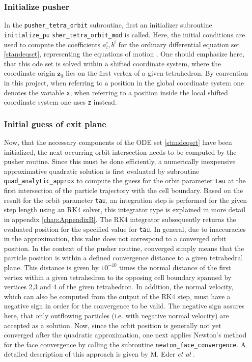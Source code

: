 \documentclass[./main.tex]{subfiles}
\begin{document}
\subsubsection{Initialize pusher} 
In the \texttt{pusher\_tetra\_orbit} subroutine, first an initializer subroutine \texttt{initialize\_pu}
\texttt{sher\_tetra\_orbit\_mod} is called. Here, the initial conditions are used to compute the coefficients $a^i_l, b^i$ for the ordinary differential equation set \ref{standeqset}, representing the equations of motion \cite{Eder_DA}. One should emphasize here, that this ode set is solved within a shifted coordinate system, where the coordinate origin $\textbf{z}_0$ lies on the first vertex of a given tetrahedron. By convention in this project, when referring to a position in the global coordinate system one denotes the variable \texttt{x}, when referring to a position inside the local shifted coordinate system one uses \texttt{z} instead.
\subsubsection{Initial guess of exit plane}
Now, that the necessary components of the ODE set \ref{standeqset} have been initialized, the next occurring orbit intersection needs to be computed by the pusher routine. Since this must be done efficiently, a numerically inexpensive approximative quadratic solution is first evaluated by subroutine \texttt{quad\_analytic\_approx} to compute the guess for the orbit parameter \texttt{tau} at the first intersection of the particle trajectory with the cell boundary. Based on the result for the orbit parameter \texttt{tau}, an integration step is performed for the given step length using an RK4 solver, this integrator type is explained in more detail in appendix \ref{chap:AppendixB}. The RK4 integrator subsequently returns the evaluated position for the specified value for \texttt{tau}. In general, due to inaccuracies in the approximation, this value does not correspond to a converged orbit position. In the context of the pusher routine, converged simply means that the particle position is within a defined convergence distance to a given tetrahedral plane. This distance is given by $10^{-10}$ times the normal distance of the first vertex within a given tetrahedron to its opposing cell boundary spanned by vertices 2,3 and 4 of the given tetrahedron. In addition, the normal velocity, which can also be computed from the output of the RK4 step, must have a negative sign in order for the convergence to be valid. The negative sign assures here, that only outflowing particles (i.e. with negative normal velocity) are accepted as a solution.  
Now, since the orbit position is generally not yet converged after the quadratic approximation, one next applies Newton's method for the face convergence by calling the subroutine \texttt{newton\_face\_convergence}. A detailed description of this approach is given by M. Eder \textit{et al} \cite{Eder_DA}. 
\end{document}
